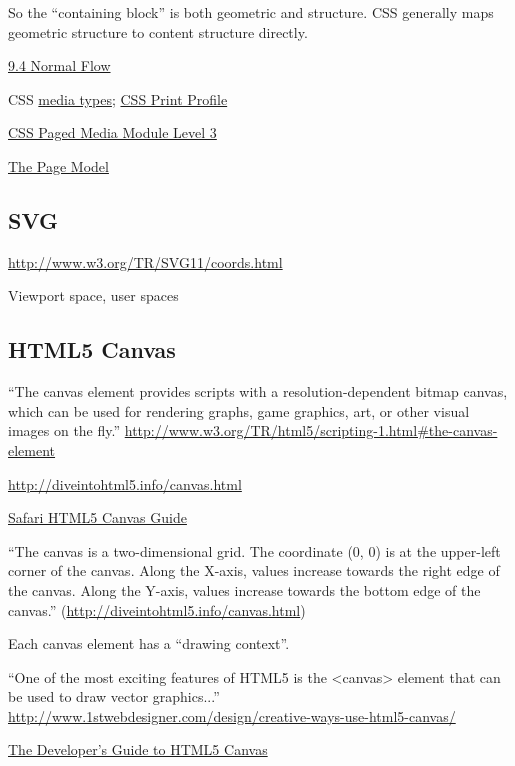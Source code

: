 \documentclass[reqno,12pt]{tufte-handout}
\numberwithin{equation}{subsection}
\numberwithin{equation}{subsection}
\begin{document}
\begin{appendices}
So the ``containing block'' is both geometric and structure.  CSS
generally maps geometric structure to content structure directly.

\href{http://www.w3.org/TR/CSS2/visuren.html#normal-flow}{9.4 Normal Flow}

CSS \href{http://www.w3.org/TR/CSS2/media.html}{media types}; \href{http://www.w3.org/TR/css-print/}{CSS Print Profile}

\href{http://www.w3.org/TR/css3-page/}{CSS Paged Media Module Level 3}

\href{http://www.w3.org/TR/css3-page/#page-model}{The Page Model}

\subsection{SVG}

\url{http://www.w3.org/TR/SVG11/coords.html}

Viewport space, user spaces

\subsection{HTML5 Canvas}
\label{subs:html5}

``The canvas element provides scripts with a resolution-dependent bitmap canvas, which can be used for rendering graphs, game graphics, art, or other visual images on the fly.'' \url{http://www.w3.org/TR/html5/scripting-1.html#the-canvas-element}

\url{http://diveintohtml5.info/canvas.html}

\href{https://developer.apple.com/library/safari/documentation/AudioVideo/Conceptual/HTML-canvas-guide/Introduction/Introduction.html#//apple_ref/doc/uid/TP40010542-CH1-SW1}{Safari HTML5 Canvas Guide}

``The canvas is a two-dimensional grid. The coordinate (0, 0) is at the upper-left corner of the canvas. Along the X-axis, values increase towards the right edge of the canvas. Along the Y-axis, values increase towards the bottom edge of the canvas.'' (\url{http://diveintohtml5.info/canvas.html})

Each canvas element has a ``drawing context''.

``One of the most exciting features of HTML5 is the <canvas> element that can be used to draw vector graphics...'' \url{http://www.1stwebdesigner.com/design/creative-ways-use-html5-canvas/}


\href{http://msdn.microsoft.com/en-us/hh534406.aspx}{The Developer’s Guide to HTML5 Canvas}


\end{appendices}
\end{document}
